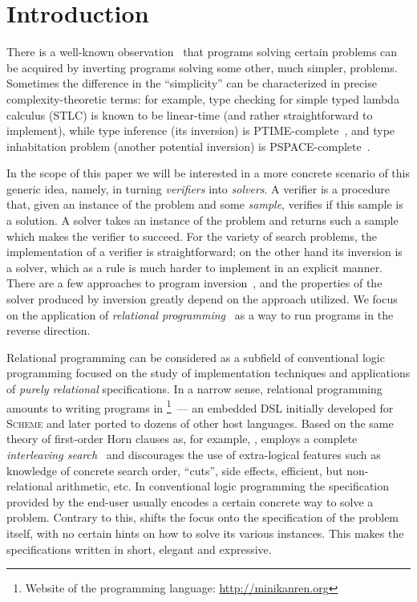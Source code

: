 \section{Introduction}


There is a well-known observation~\cite{lozov2019relational,SemanticsModifiers1} that programs solving certain problems can be acquired by inverting programs solving some other, much simpler, problems.
Sometimes the difference in the ``simplicity'' can be characterized in precise complexity-theoretic terms: for example, type checking for simple typed lambda calculus (STLC) is known to be linear-time (and rather straightforward to implement), while type inference (its inversion) is PTIME-complete~\cite{mairson2004linear}, and type inhabitation problem (another potential inversion) is PSPACE-complete~\cite{urzyczyn1997inhabitation}.

In the scope of this paper we will be interested in a more concrete scenario of this generic idea, namely, in turning \emph{verifiers} into \emph{solvers}.
A verifier is a procedure that, given an instance of the problem and some \emph{sample}, verifies if this sample is a solution.
A solver takes an instance of the problem and returns such a sample which makes the verifier to succeed.
For the variety of search problems, the implementation of a verifier is straightforward; on the other hand its inversion is a solver, which as a rule is much harder to implement in an explicit manner.
There are a few approaches to program inversion~\cite{RevURA,aman2020foundations}, and the properties of the solver produced by inversion greatly depend on the approach utilized.
We focus on the application of \emph{relational programming}~\cite{TheReasonedSchemer} as a way to run programs in the reverse direction.

Relational programming can be considered as a subfield of conventional logic programming focused on the study of implementation techniques and applications of \emph{purely relational} specifications.
In a narrow sense, relational programming amounts to writing programs in \mk\footnote{Website of the \mk programming language: \url{http://minikanren.org}}~--- an embedded DSL initially developed for \textsc{Scheme} and later ported to dozens of other host languages.
Based on the same theory of first-order Horn clauses as, for example, \prolog, \mk employs a complete \emph{interleaving search}~\cite{kiselyov2005backtracking, rozplokhas2020certified} and discourages the use of extra-logical features such as knowledge of concrete search order, ``cuts'', side effects, efficient, but non-relational arithmetic, etc.
In conventional logic programming the specification provided by the end-user usually encodes a certain concrete way to solve a problem.
Contrary to this, \mk shifts the focus onto the specification of the problem itself, with no certain hints on how to solve its various instances.
This makes the specifications written in \mk short, elegant and expressive.

